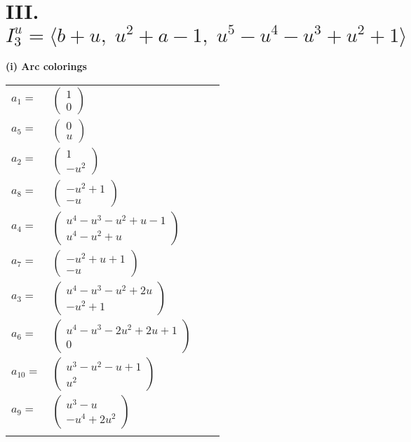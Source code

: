 \documentclass[1p]{elsarticle_modified}
\theoremstyle{definition}
\begin{document}
\centering \section*{III. $I^u_{3}= \langle b+u,\;u^2+a-1,\;u^5- u^4- u^3+u^2+1 \rangle$}
\flushleft \textbf{(i) Arc colorings}\\
\begin{tabular}{m{7pt} m{180pt} m{7pt} m{180pt} }
\flushright $a_{1}=$&$\begin{pmatrix}1\\0\end{pmatrix}$ \\
\flushright $a_{5}=$&$\begin{pmatrix}0\\u\end{pmatrix}$ \\
\flushright $a_{2}=$&$\begin{pmatrix}1\\- u^2\end{pmatrix}$ \\
\flushright $a_{8}=$&$\begin{pmatrix}- u^2+1\\- u\end{pmatrix}$ \\
\flushright $a_{4}=$&$\begin{pmatrix}u^4- u^3- u^2+u-1\\u^4- u^2+u\end{pmatrix}$ \\
\flushright $a_{7}=$&$\begin{pmatrix}- u^2+u+1\\- u\end{pmatrix}$ \\
\flushright $a_{3}=$&$\begin{pmatrix}u^4- u^3- u^2+2 u\\- u^2+1\end{pmatrix}$ \\
\flushright $a_{6}=$&$\begin{pmatrix}u^4- u^3-2 u^2+2 u+1\\0\end{pmatrix}$ \\
\flushright $a_{10}=$&$\begin{pmatrix}u^3- u^2- u+1\\u^2\end{pmatrix}$ \\
\flushright $a_{9}=$&$\begin{pmatrix}u^3- u\\- u^4+2 u^2\end{pmatrix}$\\&\end{tabular}
\end{document}
